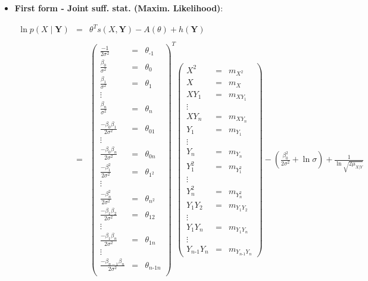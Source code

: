 \documentclass[11pt, oneside]{article}   	%
\numberwithin{figure}{section}
\numberwithin{equation}{section}
\numberwithin{table}{section}
\begin{document}
\begin{itemize}
\item \textbf{First form - Joint suff. stat. (Maxim. Likelihood)}:

\begin{eqnarray*}
\ln p(X \mid \mathbf{Y}) &=& \theta^T s(X,\mathbf{Y}) - A(\theta) + h(\mathbf{Y})\\\\
&=&
\begin{pmatrix}
\frac{-1}{2\sigma^2} &=& \theta_{\mbox{-}1} \\
\frac{\beta_0}{\sigma^2} &=& \theta_0 \\
\frac{\beta_1}{\sigma^2} &=& \theta_1 \\
\vdots\\
\frac{\beta_n}{\sigma^2} &=& \theta_n \\\\
\frac{-\beta_0\beta_1}{2\sigma^2} &=&\theta_{01} \\
\vdots\\
\frac{-\beta_0\beta_n}{2\sigma^2} &=& \theta_{0n} \\
\frac{-\beta_1^2}{2\sigma^2} &=& \theta_{1^2} \\
\vdots \\
\frac{-\beta_n^2}{2\sigma^2} &=& \theta_{n^2} \\
\frac{-\beta_1\beta_2}{2\sigma^2} &=& \theta_{12} \\
\vdots\\
\frac{-\beta_1\beta_n}{2\sigma^2} &=& \theta_{1n} \\
\vdots\\
\frac{-\beta_{n-1}\beta_n}{2\sigma^2} &=&\theta_{n\mbox{-}1n} \\
\end{pmatrix}^T
\begin{pmatrix}
X^2   &=& m_{X^2}\\
X     &=& m_{X}\\
XY_1  &=& m_{XY_1}\\
\vdots\\
XY_n  &=& m_{XY_n}\\
Y_1   &=& m_{Y_1}\\
\vdots\\
Y_n   &=& m_{Y_n}\\
Y_1^2 &=& m_{Y_1^2}\\
\vdots\\
Y_n^2 &=& m_{Y_n^2}\\
Y_1Y_2&=& m_{Y_1Y_2}\\
\vdots\\
Y_1Y_n &=& m_{Y_1Y_n}\\
\vdots\\
Y_{n\mbox{-}1}Y_n &=& m_{Y_{n\mbox{-}1}Y_{n}}
\end{pmatrix}
- \left( \frac{\beta_0^2}{2\sigma^2} + \ln{\sigma}\right) + \frac{1}{\ln{\sqrt{2\mu_{X|Y}}}}
\end{eqnarray*}


\end{itemize}
\end{document}
